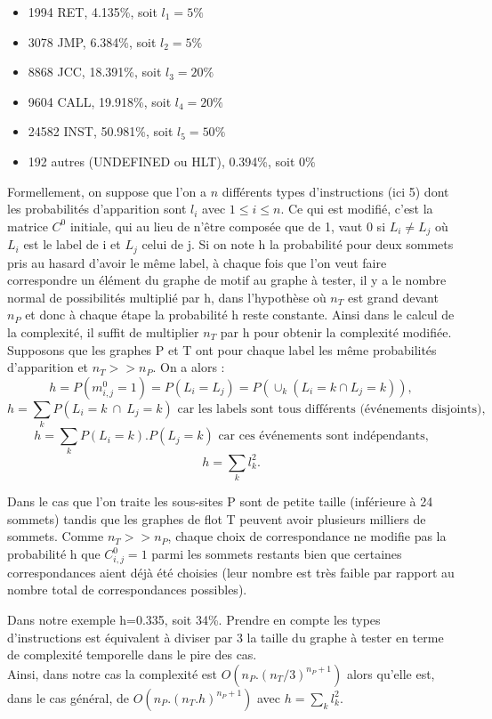 \begin{itemize}
 \item 1994 RET, 4.135\%, soit $l_1=5\%$
 \item 3078 JMP, 6.384\%, soit $l_2=5\%$
 \item 8868 JCC, 18.391\%, soit $l_3=20\%$
 \item 9604 CALL, 19.918\%, soit $l_4=20\%$
 \item 24582 INST, 50.981\%, soit $l_5=50\%$
 \item 192 autres (UNDEFINED ou HLT), 0.394\%, soit $0\%$
\\
\end{itemize}

Formellement, on suppose que l'on a $n$ différents types d'instructions (ici 5) dont les probabilités d'apparition sont $l_i$ avec $1\le i\le n$.
Ce qui est modifié, c'est la matrice $C^0$ initiale, qui au lieu de n'être composée que de 1, vaut 0 si $L_i\ne L_j$ où $L_i$ est le label de i et $L_j$ celui de j. Si on note h la probabilité pour deux sommets pris au hasard d'avoir
le même label, à chaque fois que l'on veut faire correspondre un élément du graphe de motif au graphe à tester, il y a le nombre
normal de possibilités multiplié par h, dans l'hypothèse où $n_T$ est grand devant $n_P$ et donc à chaque étape la probabilité h reste
constante. Ainsi dans le calcul de la complexité, il suffit de multiplier $n_T$ par h pour obtenir la complexité modifiée.
\\

Supposons que les graphes P et T ont pour chaque label les même probabilités d'apparition et $n_T >> n_P.$
On a alors : $$h=P(m^0_{i, j}=1)=P(L_i=L_j)=P(\cup_k(L_i=k \cap L_j=k)),$$
$$h=\sum_kP(L_i=k\ \cap\ L_j=k) \mbox{ car les labels sont tous différents (événements disjoints),}$$
$$h=\sum_kP(L_i=k).P(L_j=k) \mbox{ car ces événements sont indépendants,}$$
$$h=\sum_kl_k^2.$$

Dans le cas que l'on traite les sous-sites P sont de petite taille (inférieure à 24 sommets) tandis que les graphes de flot T peuvent avoir plusieurs milliers de sommets.
Comme $n_T >> n_P$, chaque choix de correspondance ne modifie pas la probabilité h que $C^0_{i, j}=1$ parmi les sommets restants bien que certaines correspondances aient déjà été choisies (leur nombre est très faible par rapport au nombre total de correspondances possibles).

Dans notre exemple h=0.335, soit 34\%. Prendre en compte les types d'instructions est équivalent à diviser par 3 la taille du graphe à tester
en terme de complexité temporelle dans le pire des cas.
\\
Ainsi, dans notre cas la complexité est $O(n_P.(n_T/3)^{n_P+1})$ alors qu'elle est, dans le cas général, de $O(n_P.(n_T.h)^{n_P+1})$ avec $h=\sum_kl_k^2$.

